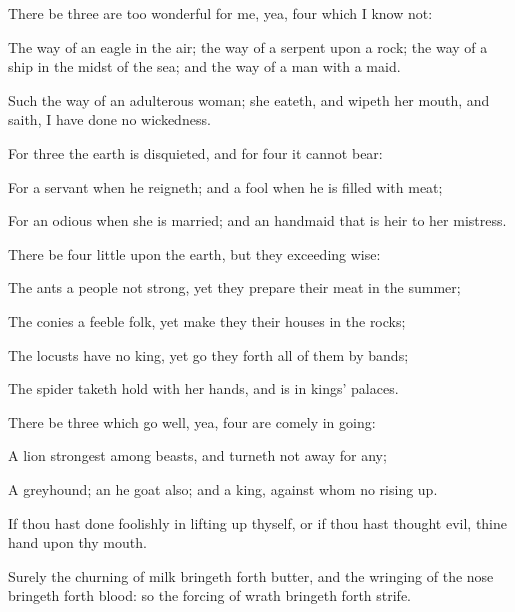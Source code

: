 {\par }{\PP {}There be
three
{} are too
wonderful for me, yea,
four which I
know not:

The
way of an
eagle in the
air; the
way of a
serpent upon a
rock; the
way of a
ship in the
midst of the
sea; and the
way of a
man with a
maid.

Such
{} the
way of an
adulterous
woman; she
eateth, and
wipeth her
mouth, and
saith, I have
done no
wickedness.

For
three
{} the
earth is
disquieted, and for
four
{} it
cannot
bear:

For a
servant when he
reigneth; and a
fool when he is
filled with
meat;

For an
odious
{} when she is
married; and an
handmaid that is
heir to her
mistress.


\par }{\PP {}There be
four
{}
little upon the
earth, but they
{}
exceeding
wise:

The
ants
{} a
people not
strong, yet they
prepare their
meat in the
summer;

The
conies
{} a
feeble
folk, yet
make they their
houses in the
rocks;

The
locusts have no
king, yet go they
forth all of them by
bands;

The
spider taketh
hold with her
hands, and is in
kings’
palaces.


\par }{\PP {}There be
three
{} which
go
well, yea,
four are
comely in
going:

A
lion
{}
strongest among
beasts, and turneth not
away
for any;

A
greyhound; an he
goat
also; and a
king, against whom
{} no rising
up.

If thou hast done
foolishly in lifting
up thyself, or if thou hast thought
evil,
{} thine
hand upon thy
mouth.

Surely the
churning of
milk bringeth
forth
butter, and the
wringing of the
nose bringeth
forth
blood: so the
forcing of
wrath bringeth
forth
strife.




}
